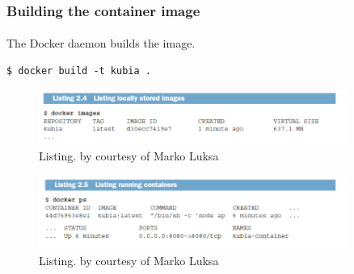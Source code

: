 \begin{frame}[fragile]
	\frametitle{Building the container image}
	\framesubtitle{}
	The Docker daemon builds the image.
	\begin{lstlisting}[numbers=none, basicstyle=\ttfamily]
$ docker build -t kubia .
	\end{lstlisting}
	\begin{figure}[htbp!]
		\includegraphics[width=0.9\textwidth]{listings/2_4.png}
		\caption{Listing. by courtesy of Marko Luksa\cite{Luksa2018}}
		\label{fig:}
	\end{figure}
	\begin{figure}[htbp!]
		\includegraphics[width=0.9\textwidth]{listings/2_5.png}
		\caption{Listing. by courtesy of Marko Luksa\cite{Luksa2018}}
		\label{fig:}
	\end{figure}
\end{frame}


